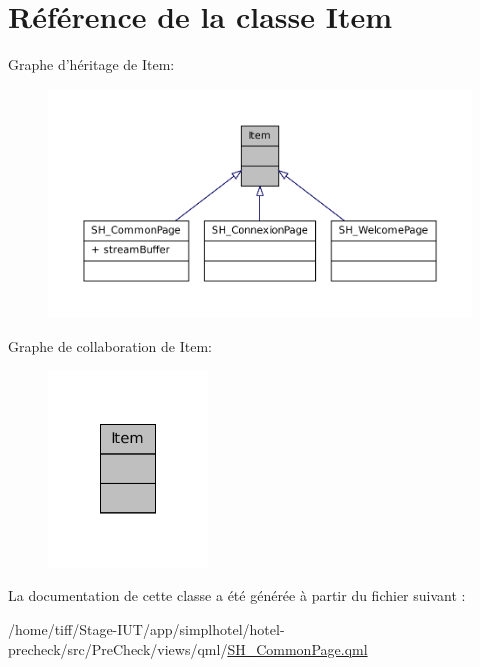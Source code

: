 \hypertarget{classItem}{\section{Référence de la classe Item}
\label{classItem}
}


Graphe d'héritage de Item\-:\nopagebreak
\begin{figure}[H]
\begin{center}
\leavevmode
\includegraphics[width=350pt]{classItem__inherit__graph}
\end{center}
\end{figure}


Graphe de collaboration de Item\-:\nopagebreak
\begin{figure}[H]
\begin{center}
\leavevmode
\includegraphics[width=120pt]{classItem__coll__graph}
\end{center}
\end{figure}


La documentation de cette classe a été générée à partir du fichier suivant \-:\begin{DoxyCompactItemize}
\item 
/home/tiff/\-Stage-\/\-I\-U\-T/app/simplhotel/hotel-\/precheck/src/\-Pre\-Check/views/qml/\hyperlink{SH__CommonPage_8qml}{S\-H\-\_\-\-Common\-Page.\-qml}\end{DoxyCompactItemize}
